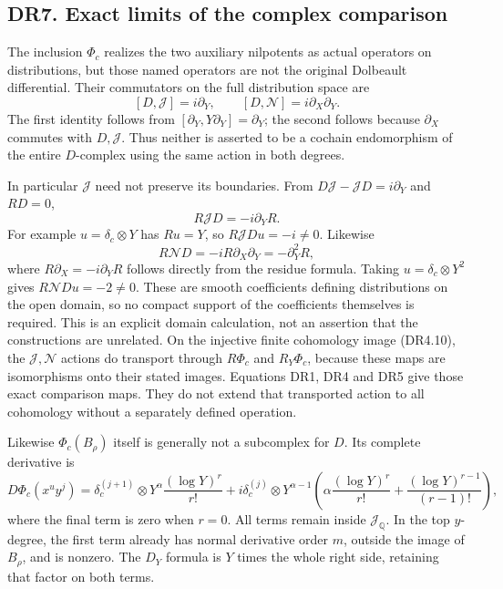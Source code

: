\subsection{DR7. Exact limits of the complex
comparison}\label{dr7.-exact-limits-of-the-complex-comparison}

The inclusion \(\Phi_c\) realizes the two auxiliary nilpotents as actual
operators on distributions, but those named operators are not the
original Dolbeault differential. Their commutators on the full
distribution space are \[
 [D,\mathscr J]=i\partial_Y,\qquad
 [D,\mathscr N]=i\partial_X\partial_Y.
\tag{DR7.1}
\] The first identity follows from
\([\partial_Y,Y\partial_Y]=\partial_Y\); the second follows because
\(\partial_X\) commutes with \(D,\mathscr J\). Thus neither is asserted
to be a cochain endomorphism of the entire \(D\)-complex using the same
action in both degrees.

In particular \(\mathscr J\) need not preserve its boundaries. From
\(D\mathscr J-\mathscr JD=i\partial_Y\) and \(RD=0\), \[
 R\mathscr JD=-i\partial_YR.
\tag{DR7.2}
\] For example \(u=\delta_c\otimes Y\) has \(Ru=Y\), so
\(R\mathscr JDu=-i\ne0\). Likewise \[
 R\mathscr ND=-iR\partial_X\partial_Y
             =-\partial_Y^2R,
\tag{DR7.2a}
\] where \(R\partial_X=-i\partial_YR\) follows directly from the residue
formula. Taking \(u=\delta_c\otimes Y^2\) gives
\(R\mathscr NDu=-2\ne0\). These are smooth coefficients defining
distributions on the open domain, so no compact support of the
coefficients themselves is required. This is an explicit domain
calculation, not an assertion that the constructions are unrelated. On
the injective finite cohomology image (DR4.10), the
\(\mathscr J,\mathscr N\) actions do transport through \(R\Phi_c\) and
\(R_Y\Phi_c\), because these maps are isomorphisms onto their stated
images. Equations DR1, DR4 and DR5 give those exact comparison maps.
They do not extend that transported action to all cohomology without a
separately defined operation.

Likewise \(\Phi_c(B_\rho)\) itself is generally not a subcomplex for
\(D\). Its complete derivative is \[
 D\Phi_c(x^uy^j)
   =\delta_c^{(j+1)}\otimes
       Y^\alpha\frac{(\log Y)^r}{r!}
    +i\delta_c^{(j)}\otimes
       Y^{\alpha-1}
        \left(
          \alpha\frac{(\log Y)^r}{r!}
          +\frac{(\log Y)^{r-1}}{(r-1)!}
        \right),
\tag{DR7.3}
\] where the final term is zero when \(r=0\). All terms remain inside
\(\mathcal J_{\mathbb Q}\). In the top \(y\)-degree, the first term
already has normal derivative order \(m\), outside the image of
\(B_\rho\), and is nonzero. The \(D_Y\) formula is \(Y\) times the whole
right side, retaining that factor on both terms.


